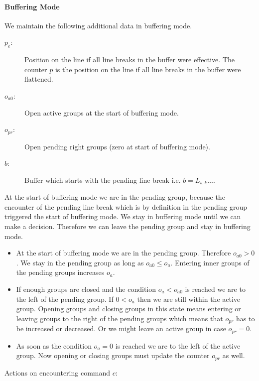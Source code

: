 \documentclass[12pt]{article}
\begin{document}
\paragraph{Buffering Mode} We maintain the following additional data in
buffering mode.
\begin{description}
\item[$p_e$:] Position on the line if all line breaks in the buffer were
  effective. The counter $p$ is the position on the line if all line breaks in
  the buffer were flattened.

\item[$o_{a0}$:] Open active groups at the start of buffering mode.

\item[$o_{pr}$:] Open pending right groups (zero at start of buffering mode).

\item[$b$:] Buffer which starts with the pending line break i.e. $b = L_{s,k}
  \ldots$.
\end{description}
%
At the start of buffering mode we are in the pending group, because the
encounter of the pending line break which is by definition in the pending
group triggered the start of buffering mode. We stay in buffering mode until
we can make a decision. Therefore we can leave the pending group and stay in
buffering mode.
\begin{itemize}
\item At the start of buffering mode we are in the pending group. Therefore
  $o_{a0} > 0$. We stay in the pending group as long as $o_{a0} \le
  o_a$. Entering inner groups of the pending groups increases $o_a$.

\item If enough groups are closed and the condition $o_a < o_{a0}$ is reached
  we are to the left of the pending group. If $0 < o_a$ then we are still
  within the active group. Opening groups and closing groups in this state
  means entering or leaving groups to the right of the pending groups which
  means that $o_{pr}$ has to be increased or decreased. Or we might leave an
  active group in case $o_{pr} = 0$.

\item As soon as the condition $o_a = 0$ is reached we are to the left of
 the active group. Now opening or closing groups must update the counter
 $o_{pr}$ as well.
\end{itemize}
Actions on encountering command $c$:
\end{document}
